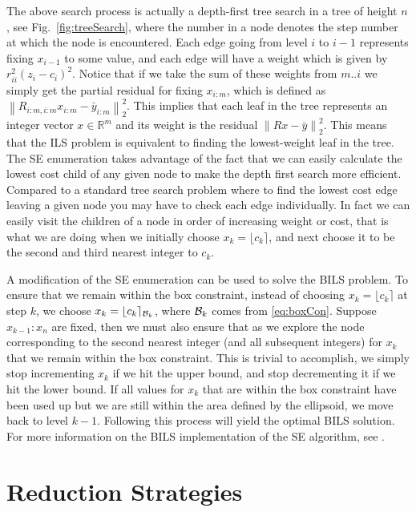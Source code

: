 \documentclass[12pt,Bold,letterpaper]{mcgilletdclass}
\begin{document}
The above search process is actually a depth-first tree search in a tree of height $n$, see Fig.\ \ref{fig:treeSearch},
where the number  in a node  denotes the step number at which the node is encountered. Each edge going from level $i$ to $i-1$ represents fixing $x_{i-1}$ to some value, and each edge will have a weight which is given by $r_{ii}^2(z_i -
c_i)^2$. Notice that if we take the sum of these weights from $m..i$ we simply get the partial
residual for fixing $x_{i:m}$, which is defined as $\left \| R_{i:m,i:m}x_{i:m} -
\bar{y}_{i:m} \right \|_2^2$. This implies that each leaf in the tree
represents an integer vector $x \in \mathbb{R}^m$ and its weight is the residual $\left \|
Rx - \bar{y} \right \|_2^2$. This means that the ILS problem is equivalent to
finding the lowest-weight leaf in the tree. The SE enumeration takes advantage
of the fact that we can easily calculate the lowest cost child of any given
node to make the depth first search more efficient. Compared to a standard tree search problem where to find the lowest cost edge leaving a given node you may have to check each edge individually. In fact we can easily visit
the children of a node in order of increasing weight or cost, that is what we are doing when we initially choose $x_k = \lfloor c_k \rceil$, and next choose it to be the second and third nearest integer to $c_k$.

A modification of the SE enumeration can be used to solve the BILS problem. To ensure that we remain within the box constraint, instead of choosing $x_k = \lfloor c_k \rceil$ at step $k$, we choose $x_{k} = \lfloor c_{k} \rceil_{{\cal B}_{k}}$, where ${\cal B}_{k}$ comes from \eqref{eq:boxCon}. Suppose $x_{k-1}:x_n$ are fixed, then we must also ensure that as we explore the node corresponding to the second nearest integer (and all subsequent integers) for $x_k$ that we remain within the box constraint. This is trivial to accomplish, we simply stop incrementing $x_k$ if we hit the upper bound, and stop decrementing it if we hit the lower bound. If all values for $x_k$ that are within the box constraint have been used up but we are still within the area defined by the ellipsoid, we move back to level $k-1$. Following this process will yield the optimal BILS solution. For more information on the BILS implementation of the SE algorithm, see \cite{ChaH05}.

\chapter{Reduction Strategies} \label{chap:Reduction}
\end{document}
